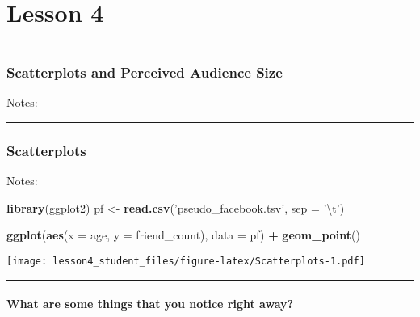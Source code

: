 \documentclass[]{article}
\title{}
\author{}
\date{}
\newenvironment{Shaded}{\begin{snugshade}}{\end{snugshade}}
\newcommand{\KeywordTok}[1]{\textcolor[rgb]{0.13,0.29,0.53}{\textbf{#1}}}
\newcommand{\DataTypeTok}[1]{\textcolor[rgb]{0.13,0.29,0.53}{#1}}
\newcommand{\CharTok}[1]{\textcolor[rgb]{0.31,0.60,0.02}{#1}}
\newcommand{\StringTok}[1]{\textcolor[rgb]{0.31,0.60,0.02}{#1}}
\newcommand{\OperatorTok}[1]{\textcolor[rgb]{0.81,0.36,0.00}{\textbf{#1}}}
\newcommand{\NormalTok}[1]{#1}
\let\oldparagraph\paragraph
\renewcommand{\paragraph}[1]{\oldparagraph{#1}\mbox{}}
\begin{document}
\section{Lesson 4}\label{lesson-4}

\begin{center}\rule{0.5\linewidth}{\linethickness}\end{center}

\subsubsection{Scatterplots and Perceived Audience
Size}\label{scatterplots-and-perceived-audience-size}

Notes:

\begin{center}\rule{0.5\linewidth}{\linethickness}\end{center}

\subsubsection{Scatterplots}\label{scatterplots}

Notes:

\begin{Shaded}
\begin{Highlighting}[]
\KeywordTok{library}\NormalTok{(ggplot2)}
\NormalTok{pf <-}\StringTok{ }\KeywordTok{read.csv}\NormalTok{(}\StringTok{'pseudo_facebook.tsv'}\NormalTok{, }\DataTypeTok{sep =} \StringTok{'}\CharTok{\textbackslash{}t}\StringTok{'}\NormalTok{)}

\KeywordTok{ggplot}\NormalTok{(}\KeywordTok{aes}\NormalTok{(}\DataTypeTok{x =}\NormalTok{ age, }\DataTypeTok{y =}\NormalTok{ friend_count), }\DataTypeTok{data =}\NormalTok{ pf) }\OperatorTok{+}
\StringTok{  }\KeywordTok{geom_point}\NormalTok{()}
\end{Highlighting}
\end{Shaded}

\texttt{[image: lesson4\_student\_files/figure-latex/Scatterplots-1.pdf]}

\begin{center}\rule{0.5\linewidth}{\linethickness}\end{center}

\paragraph{What are some things that you notice right
away?}\label{what-are-some-things-that-you-notice-right-away}
\end{document}
